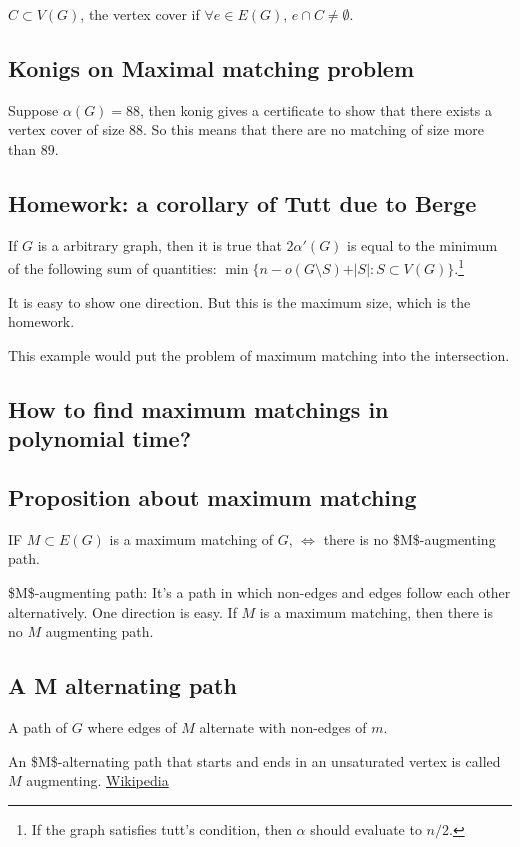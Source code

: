 \documentclass[11pt]{article}
\def\min{\operatorname{min}}
\begin{document}
\(C \subset V(G)\), the vertex cover if \(\forall e \in E(G)\), \(e\cap C \neq
   \emptyset\).
\subsection{Konigs on Maximal matching problem}
\label{sec:org5ca5817}
Suppose \(\alpha(G) = 88\), then konig gives a certificate to show that there
exists a vertex cover of size \(88\). So this means that there are no matching
of size more than \(89\).
\subsection{Homework: a corollary of Tutt due to Berge}
\label{sec:org317658a}
If \(G\) is a arbitrary graph, then it is true that \(2\alpha'(G)\) is equal to
the minimum of the following sum of quantities: \(\min \{ n - o(G\setminus
   S) + \vert S \vert \colon S \subset V(G) \}\).\footnote{If the graph satisfies tutt's condition, then \(\alpha\) should evaluate
to \(n/2\).}

It is easy to show one direction. But this is the maximum size, which is the homework.

This example would put the problem of maximum matching into the intersection.
\subsection{How to find maximum matchings in polynomial time?}
\label{sec:org0746afa}
\subsection{Proposition about maximum matching}
\label{sec:org359c099}
IF \(M \subset E(G)\) is a maximum matching of \(G\), \(\iff\) there is no
\$M\$-augmenting path.

\$M\$-augmenting path: It's a path in which non-edges and edges follow each
other alternatively. One direction is easy. If \(M\) is a maximum matching,
then there is no \(M\) augmenting path.
\subsection{A M alternating path}
\label{sec:org21ef251}
A path of \(G\) where edges of \(M\) alternate with non-edges of \(m\).

An \$M\$-alternating path that starts and ends in an unsaturated vertex is
called \(M\) augmenting. \href{https://en.wikipedia.org/wiki/Saturation\_(graph\_theory)}{Wikipedia}
\end{document}
